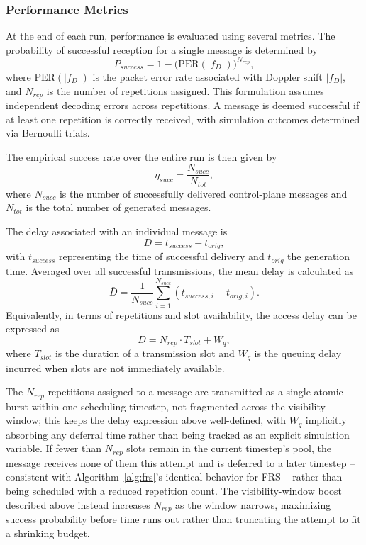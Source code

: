 \documentclass[conference]{IEEEtran}
\begin{document}
\subsubsection{Performance Metrics}
At the end of each run, performance is evaluated using several metrics. The probability of successful reception for a single message is determined by
\begin{equation}
P_{success} = 1 - \big(\text{PER}(|f_D|)\big)^{N_{rep}},
\end{equation}
where $\text{PER}(|f_D|)$ is the packet error rate associated with Doppler shift $|f_D|$, and $N_{rep}$ is the number of repetitions assigned. This formulation assumes independent decoding errors across repetitions. A message is deemed successful if at least one repetition is correctly received, with simulation outcomes determined via Bernoulli trials.

The empirical success rate over the entire run is then given by
\begin{equation}
\eta_{succ} = \frac{N_{succ}}{N_{tot}},
\end{equation}
where $N_{succ}$ is the number of successfully delivered control-plane messages and $N_{tot}$ is the total number of generated messages.

The delay associated with an individual message is
\begin{equation}
D = t_{success} - t_{orig},
\end{equation}
with $t_{success}$ representing the time of successful delivery and $t_{orig}$ the generation time. Averaged over all successful transmissions, the mean delay is calculated as
\begin{equation}
\bar{D} = \frac{1}{N_{succ}} \sum_{i=1}^{N_{succ}} \left( t_{success,i} - t_{orig,i} \right).
\end{equation}
Equivalently, in terms of repetitions and slot availability, the access delay can be expressed as
\begin{equation}
D = N_{rep} \cdot T_{slot} + W_q,
\end{equation}
where $T_{slot}$ is the duration of a transmission slot and $W_q$ is the queuing delay incurred when slots are not immediately available.

The $N_{rep}$ repetitions assigned to a message are transmitted as a single atomic burst within one scheduling timestep, not fragmented across the visibility window; this keeps the delay expression above well-defined, with $W_q$ implicitly absorbing any deferral time rather than being tracked as an explicit simulation variable. If fewer than $N_{rep}$ slots remain in the current timestep's pool, the message receives none of them this attempt and is deferred to a later timestep -- consistent with Algorithm~\ref{alg:frs}'s identical behavior for FRS -- rather than being scheduled with a reduced repetition count. The visibility-window boost described above instead increases $N_{rep}$ as the window narrows, maximizing success probability before time runs out rather than truncating the attempt to fit a shrinking budget.
\end{document}
